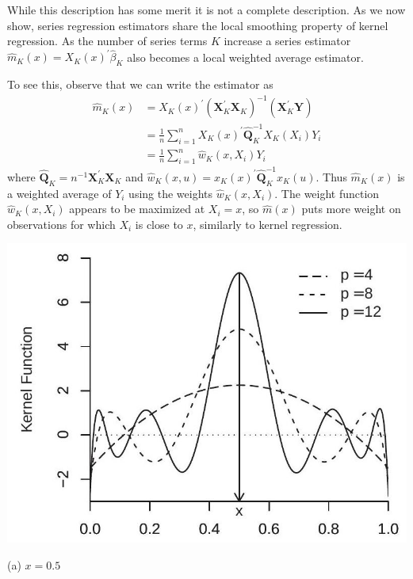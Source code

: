 \documentclass[10pt]{article}
\begin{document}
While this description has some merit it is not a complete description. As we now show, series regression estimators share the local smoothing property of kernel regression. As the number of series terms $K$ increase a series estimator $\widehat{m}_{K}(x)=X_{K}(x)^{\prime} \widehat{\beta}_{K}$ also becomes a local weighted average estimator.

To see this, observe that we can write the estimator as
$$
\begin{aligned}
\widehat{m}_{K}(x) &=X_{K}(x)^{\prime}\left(\boldsymbol{X}_{K}^{\prime} \boldsymbol{X}_{K}\right)^{-1}\left(\boldsymbol{X}_{K}^{\prime} \boldsymbol{Y}\right) \\
&=\frac{1}{n} \sum_{i=1}^{n} X_{K}(x)^{\prime} \widehat{\boldsymbol{Q}}_{K}^{-1} X_{K}\left(X_{i}\right) Y_{i} \\
&=\frac{1}{n} \sum_{i=1}^{n} \widehat{w}_{K}\left(x, X_{i}\right) Y_{i}
\end{aligned}
$$
where $\widehat{\boldsymbol{Q}}_{K}=n^{-1} \boldsymbol{X}_{K}^{\prime} \boldsymbol{X}_{K}$ and $\widehat{w}_{K}(x, u)=x_{K}(x)^{\prime} \widehat{\boldsymbol{Q}}_{K}^{-1} x_{K}(u)$. Thus $\widehat{m}_{K}(x)$ is a weighted average of $Y_{i}$ using the weights $\widehat{w}_{K}\left(x, X_{i}\right)$. The weight function $\widehat{w}_{K}\left(x, X_{i}\right)$ appears to be maximized at $X_{i}=x$, so $\widehat{m}(x)$ puts more weight on observations for which $X_{i}$ is close to $x$, similarly to kernel regression.

\includegraphics[max width=\textwidth]{2022_10_23_2b38d6d54e7725c196e7g-08}

(a) $x=0.5$
\end{document}
